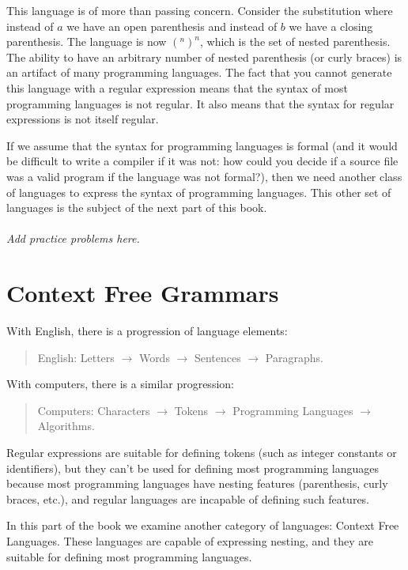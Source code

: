 \documentclass[letterpaper,12pt,openany,reqno]{book}%
\newcommand{\needsproblems}{\paragraph{Add practice problems here.}}
\begin{document}
This language is of more than passing concern. Consider the substitution where instead of $a$ we have an open parenthesis and instead of $b$ we have a closing parenthesis. The language is now $(^n )^n$, which is the set of nested parenthesis. The ability to have an arbitrary number of nested parenthesis (or curly braces) is an artifact of many programming languages. The fact that you cannot generate this language with a regular expression means that the syntax of most programming languages is not regular. It also means that the syntax for regular expressions is not itself regular.

If we assume that the syntax for programming languages is formal (and it would be difficult to write a compiler if it was not: how could you decide if a source file was a valid program if the language was not formal?), then we need another class of languages to express the syntax of programming languages. This other set of languages is the subject of the next part of this book.

\needsproblems

\part{Context Free Grammars}
With English, there is a progression of language elements:
\begin{quote}
English: Letters $\rightarrow$ Words $\rightarrow$ Sentences $\rightarrow$ Paragraphs.
\end{quote}
With computers, there is a similar progression:
\begin{quote}
Computers: Characters $\rightarrow$ Tokens $\rightarrow$ Programming Languages $\rightarrow$ Algorithms.
\end{quote}

Regular expressions are suitable for defining tokens (such as integer constants or identifiers), but they can't be used for defining most programming languages because most programming languages have nesting features (parenthesis, curly braces, etc.), and regular languages are incapable of defining such features. 

In this part of the book we examine another category of languages: Context Free Languages. These languages are capable of expressing nesting, and they are suitable for defining most programming languages.
\end{document}
